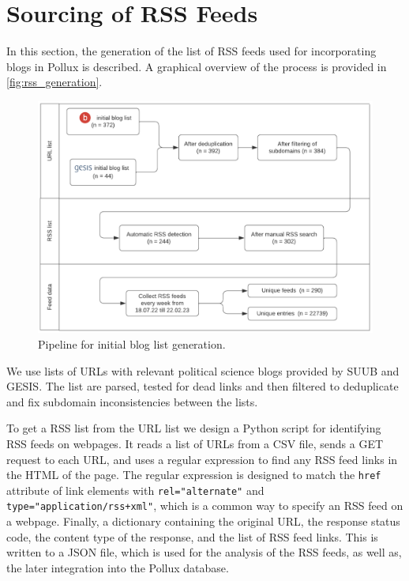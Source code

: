 \documentclass{article}
\begin{document}
\section{Sourcing of RSS Feeds}\label{sec:sourcing}
In this section, the generation of the list of RSS feeds used for incorporating blogs in Pollux is described. A graphical overview of the process is provided in \autoref{fig:rss_generation}.

\begin{figure}[htb]
	\centering
	\includegraphics[width=.7\textwidth]{figures/generation_of_initial_list.png}
	\caption{Pipeline for initial blog list generation.}
	\label{fig:rss_generation}
\end{figure}

We use lists of URLs with relevant political science blogs provided by SUUB and GESIS. The list are parsed, tested for dead links and then filtered to deduplicate and fix subdomain inconsistencies between the lists.

To get a RSS list from the URL list we design a Python script for identifying RSS feeds on webpages. It reads a list of URLs from a CSV file, sends a GET request to each URL, and uses a regular expression to find any RSS feed links in the HTML of the page. The regular expression is designed to match the \texttt{href} attribute of link elements with \texttt{rel="alternate"} and \texttt{type="application/rss+xml"}, which is a common way to specify an RSS feed on a webpage. Finally, a dictionary containing the original URL, the response status code, the content type of the response, and the list of RSS feed links. This is written to a JSON file, which is used for the analysis of the RSS feeds, as well as, the later integration into the Pollux database.
\end{document}

